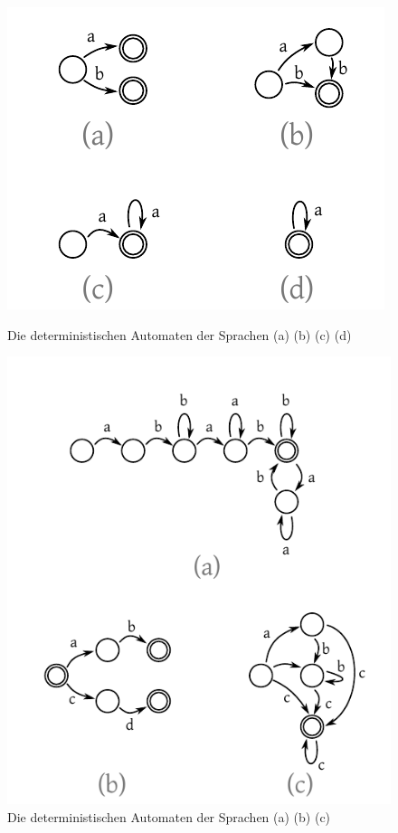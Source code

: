 \begin{figure}[p]
 \begin{center}
  \includegraphics{img/basic_deterministic_automatons.pdf}
  \caption{
    Die deterministischen Automaten der Sprachen
    (a)  (b)  (c)  (d) 
  }
  \label{fig:basic_automatons}
 \end{center}
 \begin{center}
  \includegraphics{img/deterministic_automatons.pdf}
  \caption{Die deterministischen Automaten der Sprachen
    (a)  (b)  (c) }
  \label{fig:example_automatons}
 \end{center}
\end{figure}

